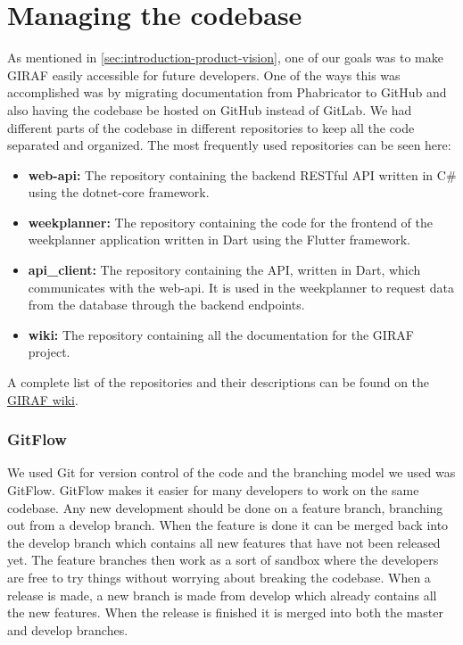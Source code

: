 \section{Managing the codebase}
As mentioned in \autoref{sec:introduction-product-vision}, one of our goals was to make GIRAF easily accessible for future developers.
One of the ways this was accomplished was by migrating documentation from Phabricator to GitHub and also having the codebase be hosted on GitHub instead of GitLab.
We had different parts of the codebase in different repositories to keep all the code separated and organized.
The most frequently used repositories can be seen here:

\begin{itemize}
    \item \textbf{web-api:} The repository containing the backend RESTful API written in C\# using the dotnet-core framework.
    \item \textbf{weekplanner:} The repository containing the code for the frontend of the weekplanner application written in Dart using the Flutter framework. 
    \item \textbf{api\_client:} The repository containing the API, written in Dart, which communicates with the web-api. It is used in the weekplanner to request data from the database through the backend endpoints.
    \item \textbf{wiki:} The repository containing all the documentation for the GIRAF project. 
\end{itemize}
A complete list of the repositories and their descriptions can be found on the \href{https://github.com/aau-giraf/wiki/blob/master/Repositories/repository_discription.md}{GIRAF wiki}.

\subsubsection{GitFlow}
We used Git for version control of the code and the branching model we used was GitFlow. 
GitFlow makes it easier for many developers to work on the same codebase. 
Any new development should be done on a feature branch, branching out from a develop branch. 
When the feature is done it can be merged back into the develop branch which contains all new features that have not been released yet. 
The feature branches then work as a sort of sandbox where the developers are free to try things without worrying about breaking the codebase. 
When a release is made, a new branch is made from develop which already contains all the new features. 
When the release is finished it is merged into both the master and develop branches.
